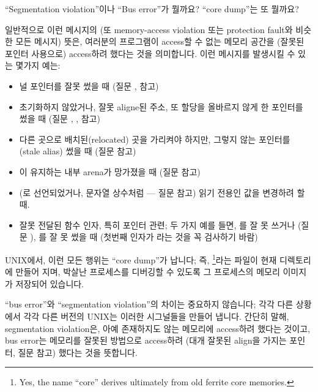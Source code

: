\begin{faq}
	``Segmentation violation''이나 ``Bus error''가 뭘까요?
	``core dump''는 또 뭘까요?

\A
	일반적으로 이런 메시지의 (또 memory-access violation 또는 protection 
        fault와 비슷한 모든 메시지) 뜻은, 여러분의 프로그램이 access할 수 없는 
        메모리 공간을 (잘못된 포인터 사용으로) access하려 했다는 것을 의미합니다.
        이런 메시지를 발생시킬 수 있는 몇가지 예는:
        \begin{itemize}
          \item 널 포인터를 잘못 썼을 때 (질문 ,  참고)
          \item 초기화하지 않았거나, 잘못 aligne된 주소, 또 할당을 올바르지 않게
            한 포인터를 썼을 때 (질문 , ,  참고)
          \item 다른 곳으로 배치된(relocated) 곳을 가리켜야 하지만, 그렇지 않는
            포인터를  (stale alias) 썼을 때 (질문  참고)
          \item {}이 유지하는 내부 arena가 망가졌을 때 
            (질문  참고)
          \item (로 선언되었거나, 문자열 상수처럼 --- 질문  참고)
            읽기 전용인 값을 변경하려 할 때.
          \item 잘못 전달된 함수 인자, 특히 포인터 관련; 두 가지 예를 들면,
            를 잘 못 쓰거나 (질문 ), 를
            잘 못 썼을 때 (첫번째 인자가 라는 것을 꼭 검사하기 바람)
        \end{itemize}
        \noindent UNIX에서, 이런 모든 행위는 ``core dump''가 납니다; 즉,
        \footnote{Yes, the name ``core'' derives ultimately from old
          ferrite core memories.}라는 파일이 현재 디렉토리에 만들어 지며, 
        박살난 프로세스를 디버깅할 수 있도록 그 프로세스의 메모리 이미지가 저장되어
        있습니다.
        
        ``bus error''와 ``segmentation violation''의 차이는 중요하지 않습니다;
        각각 다른 상황에서 각각 다른 버전의 UNIX는 이러한 시그널들을 만들어 냅니다.
        간단히 말해, segmentation violation은, 아예 존재하지도 않는 메모리에
        access하려 했다는 것이고, bus error는 메모리를 잘못된 방법으로 access하려
        (대개 잘못된 align을 가지는 포인터, 질문  참고) 했다는 것을 뜻합니다.
        
\end{faq}

%
%
